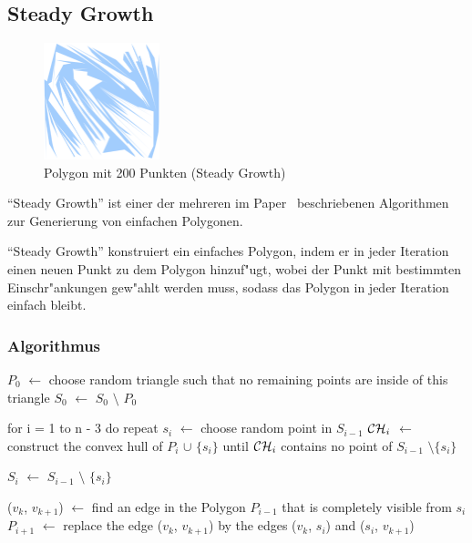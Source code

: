 
\subsection{Steady Growth}

  \begin{figure}[h]
    \begin{center}
      \includegraphics[width=0.3\textwidth]{img/steady200.eps}
    \end{center}
    \caption{Polygon mit 200 Punkten (Steady Growth)}
    \label{fig:steady200}
  \end{figure}

  \enquote{Steady Growth} ist einer der mehreren im Paper~\cite{held98polygons}
  beschriebenen Algorithmen zur Generierung von einfachen Polygonen.

  \enquote{Steady Growth} konstruiert ein einfaches Polygon, indem er in jeder
  Iteration einen neuen Punkt zu dem Polygon hinzuf"ugt, wobei der Punkt mit
  bestimmten Einschr"ankungen gew"ahlt werden muss, sodass das Polygon in jeder
  Iteration einfach bleibt.

  \subsubsection{Algorithmus}

\begin{code}[caption={Steady Growth}, mathescape=true]
$P_0$ $\leftarrow$ choose random triangle such that no remaining points are inside of this triangle
$S_0$ $\leftarrow$ $S_0$ $\setminus$ $P_0$

for i = 1 to n - 3 do
  repeat
    $s_i$ $\leftarrow$ choose random point in $S_{i-1}$
    $\mathcal{CH}_i$ $\leftarrow$ construct the convex hull of $P_i$ $\cup$ $\{s_i\}$
  until $\mathcal{CH}_i$ contains no point of $S_{i-1}$ $\setminus \{s_i\}$

  $S_i$ $\leftarrow$ $S_{i-1}$ $\setminus$ $\{s_i\}$

  ($v_k$, $v_{k+1}$) $\leftarrow$ find an edge in the Polygon $P_{i-1}$ that is completely visible from $s_i$
  $P_{i+1}$ $\leftarrow$ replace the edge ($v_k$, $v_{k+1}$) by the edges ($v_k$, $s_i$) and ($s_i$, $v_{k+1}$)

\end{code}

